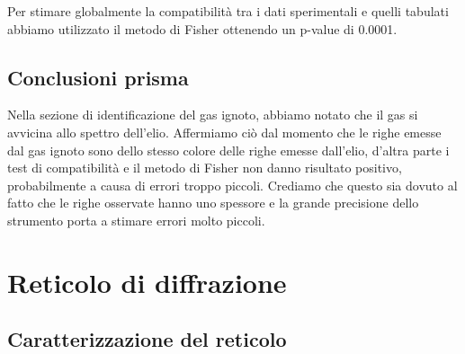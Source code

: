 \documentclass[letterpaper,12pt]{article}
\begin{document}
Per stimare globalmente la compatibilità tra i dati sperimentali e quelli tabulati abbiamo utilizzato il metodo di 
Fisher ottenendo un p-value di 0.0001.

\subsection{Conclusioni prisma}

Nella sezione di identificazione del gas ignoto, abbiamo notato che il gas si avvicina allo spettro dell'elio. 
Affermiamo ciò dal momento che le righe emesse dal gas ignoto sono dello stesso colore delle righe emesse dall'elio, 
d'altra parte i test di compatibilità e il metodo di Fisher non danno risultato positivo, probabilmente a causa di 
errori troppo piccoli. Crediamo che questo sia dovuto al fatto che le righe osservate hanno uno spessore e la grande
precisione dello strumento porta a stimare errori molto piccoli.\\

\section{Reticolo di diffrazione}

\subsection{Caratterizzazione del reticolo}
\end{document}
